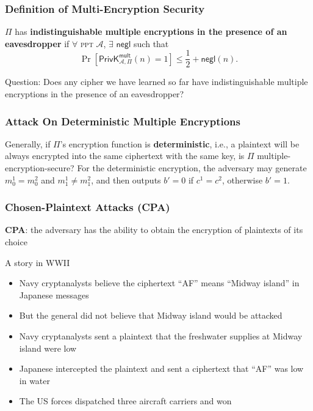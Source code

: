 \begin{frame}\frametitle{Definition of Multi-Encryption Security}
\begin{definition}\label{def:sme}
$\Pi$ has \textbf{indistinguishable multiple encryptions in the presence of an eavesdropper} if $\forall$ \textsc{ppt} $\mathcal{A}$, $\exists$ $\mathsf{negl}$ such that
\[ \Pr\left[\mathsf{PrivK}^{\mathsf{mult}}_{\mathcal{A},\Pi}(n)=1\right] \le \frac{1}{2} + \mathsf{negl}(n).
\]
\end{definition}
\begin{exampleblock}{Question:}
Does any cipher we have learned so far have indistinguishable multiple encryptions in the presence of an eavesdropper?
\end{exampleblock}
\end{frame}
\begin{frame}\frametitle{Attack On Deterministic Multiple Encryptions}
\begin{exampleblock}{Generally, if $\Pi$'s encryption function is \textbf{deterministic}, i.e., a plaintext will be always encrypted into the same ciphertext with the same key, is $\Pi$ multiple-encryption-secure?}
For the deterministic encryption, the adversary may generate $m_0^1 = m_0^2$ and $m_1^1 \neq m_1^2$, and then outputs $b'=0$ if $c^1 = c^2$, otherwise $b'=1$.
\end{exampleblock}
\end{frame}
\begin{frame}\frametitle{Chosen-Plaintext Attacks (CPA)}
\textbf{CPA}: the adversary has the ability to obtain the encryption of plaintexts of its choice
\begin{exampleblock}{A story in WWII}
\begin{itemize}
\item Navy cryptanalysts believe the ciphertext ``AF'' means ``Midway island'' in Japanese messages
\item But the general did not believe that Midway island would be attacked
\item Navy cryptanalysts sent a plaintext that the freshwater supplies at Midway island were low
\item Japanese intercepted the plaintext and sent a ciphertext that ``AF'' was low in water
\item The US forces dispatched three aircraft carriers and won
\end{itemize}
\end{exampleblock}
\end{frame}
